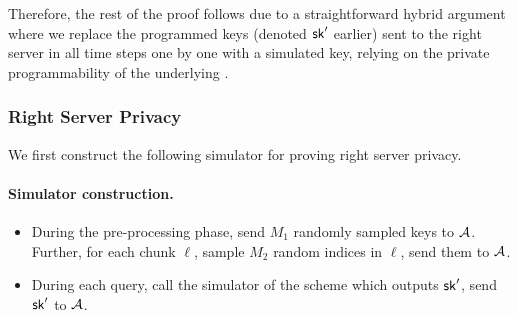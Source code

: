 Therefore, the rest of the proof follows
due to a straightforward hybrid argument
where we replace
the programmed keys (denoted $\mathsf{sk}'$ earlier) 
sent to the right server in all time steps one by one
with a simulated key, 
relying on the private programmability of the underlying \ppps. 






\subsubsection{Right Server Privacy}

We first construct 
the following simulator for proving right server privacy.

\paragraph{Simulator construction.}
\begin{itemize}[leftmargin=5mm]
\item  
During the pre-processing phase, 
send $M_1$ randomly sampled \ppps keys to $\mathcal{A}$.
Further, for each chunk $\ell$, sample $M_2$ 
random indices in $\ell$, send them to $\mathcal{A}$.
\item 
During each query, 
call the simulator of the \ppps scheme which outputs $\mathsf{sk}'$, 
send $\mathsf{sk}'$ to $\mathcal{A}$. 
\end{itemize}


